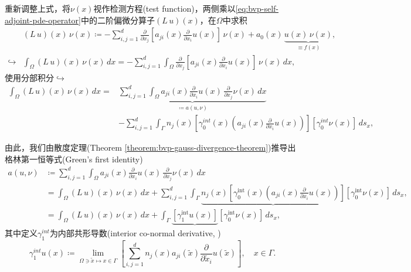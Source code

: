 重新调整上式，将$\nu(x)$视作检测方程(test function)，两侧乘以\eqref{eq:bvp-self-adjoint-pde-operator}中的二阶偏微分算子$\left(L\,u\right)(x)$，在$\Omega$中求积
\begin{equation}
  \begin{split}
    &\left( L \, u \right)(x) \, \nu(x) \coloneqq - \sum_{i,j=1}^d \frac{\partial}{\partial x_j} \left[ a_{ji} (x) \frac{\partial}{\partial x_i} u(x)\right] \, \nu(x) + a_0(x)\, \underbrace{u(x) \, \nu(x)}_{\equiv f(x)}, \\
    \hookrightarrow & \int_{\Omega} \left( L \, u \right)(x) \, \nu(x) \, dx = - \sum_{i,j=1}^d \int_{\Omega} \frac{\partial}{\partial x_j} \left[ a_{ji} (x) \frac{\partial}{\partial x_i} u(x)\right] \, \nu(x) \, dx,
  \end{split}
\end{equation}
使用分部积分$\hookrightarrow$
\begin{equation*}
  \begin{split}
    \int_{\Omega} \left( L \, u \right)(x) \, \nu(x) \, dx =&  \underbrace{\sum_{i,j=1}^d \int_{\Omega} a_{ji}(x) \frac{\partial}{\partial x_i} u(x) \, \frac{\partial}{\partial x_j} \nu(x) \, dx}_{\coloneqq a\left(u,\nu \right)} \\
   &- \sum_{i,j=1}^{d} \int_{\Gamma} n_j(x) \left[ \gamma_0^{int} (x) \left( a_{ji}(x) \frac{\partial}{\partial x_i} u(x)\right) \right] \left[ \gamma_0^{int} \nu(x) \right] \, d s_x,
  \end{split}
\end{equation*}

由此，我们由散度定理(Theorem \ref{theorem:bvp-gauss-divergence-theorem})推导出格林第一恒等式(Green's first identity)
\begin{equation}
  \label{eq:bvp-a-u-nu-inner-prod}
  \begin{split}
  a\left(u,\nu \right) &\coloneqq \sum_{i,j=1}^d \int_{\Omega} a_{ji}(x) \frac{\partial}{\partial x_i} u(x) \, \frac{\partial}{\partial x_j} \nu(x) \, dx \\
  & = \int_{\Omega} \left( L \, u \right)(x) \, \nu(x) \, dx + \sum_{i,j=1}^{d} \int_{\Gamma} \underbrace{n_j(x) \left[ \gamma_0^{\text{int}} (x) \left( a_{ji}(x) \frac{\partial}{\partial x_i} u(x)\right) \right]} \left[ \gamma_0^{\text{int}} \nu(x) \right] \, d s_x,\\
  & =\int_{\Omega} \left( L \, u \right)(x) \, \nu(x) \, dx + \int_{\Gamma} \underbrace{\left[ \gamma_1^{\text{int}} u(x) \right]} \left[ \gamma_0^{\text{int}} \nu(x) \right] \, d s_x,
  \end{split}
\end{equation}
其中定义$\gamma_1^{int}$为内部共形导数(interior co-normal derivative, \cite{Mikhailov:2006vo, Mikhailov:2009wj, Ancona:2009bo})
\begin{equation}
  \label{eq:bvp-int-conformal-derivative}
  \gamma_1^{int}u(x) \coloneqq \lim_{\Omega \owns \tilde{x} \mapsto x \in \Gamma} \left[
\sum_{i,j=1}^{d} n_j(x) a_{ji}\left( \tilde{x} \right) \frac{\partial}{\partial \tilde{x}_i} u \left( \tilde{x} \right)
  \right], \quad x \in \Gamma.
\end{equation}

